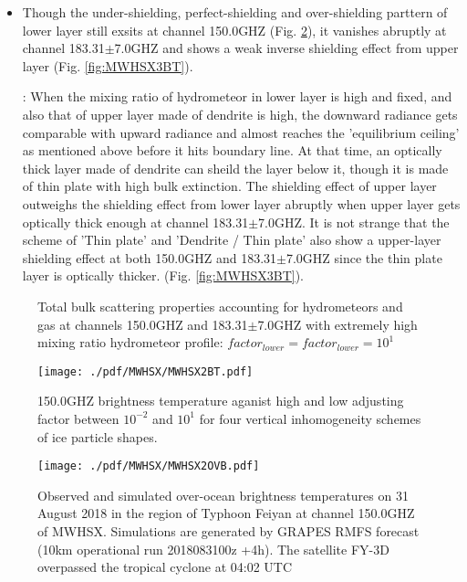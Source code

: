 \begin{itemize}
    \item {}
    Though the under-shielding, perfect-shielding and over-shielding parttern of lower layer still exsits at channel 150.0GHZ (Fig. \ref{fig:MWHSX2BT}), it vanishes abruptly 
at channel 183.31$\pm$7.0GHZ and shows a weak inverse shielding effect from upper layer (Fig. \ref{fig:MWHSX3BT}).

    : When the mixing ratio of hydrometeor in lower layer is high and fixed, and also that of upper layer made of dendrite is high, 
the downward radiance gets comparable with upward radiance and almost reaches the 'equilibrium ceiling' as mentioned above before it hits boundary line.
At that time, an optically thick layer made of dendrite can sheild the layer below it, though it is made of thin plate with high bulk extinction.
The shielding effect of upper layer outweighs the shielding effect from lower layer abruptly when upper layer gets optically thick enough at channel 183.31$\pm$7.0GHZ.
It is not strange that the scheme of 'Thin plate' and 'Dendrite / Thin plate' also show a upper-layer shielding effect 
at both 150.0GHZ and 183.31$\pm$7.0GHZ since the thin plate layer is optically thicker.
(Fig. \ref{fig:MWHSX3BT}).  
\end{itemize}


\begin{figure}[hbtp] 
\centering
{}
\caption{Total bulk scattering properties accounting for hydrometeors and gas at channels 150.0GHZ
and 183.31$\pm$7.0GHZ with extremely high mixing ratio hydrometeor profile: $factor_{lower} = factor_{lower} = 10^{1}$}
\label{fig:MWHSX23ABSP}
\end{figure}

\begin{figure}[hbtp] 
\centering
\texttt{[image: ./pdf/MWHSX/MWHSX2BT.pdf]}
\caption{150.0GHZ brightness temperature aganist high and low adjusting factor between $10^{-2}$ and $10^{1}$ for four vertical 
inhomogeneity schemes of ice particle shapes.}
\label{fig:MWHSX2BT}
\end{figure}

\begin{figure}[hbtp] 
\centering
\texttt{[image: ./pdf/MWHSX/MWHSX2OVB.pdf]}
\caption{Observed and simulated over-ocean brightness temperatures on 31 August 2018 in the region of Typhoon Feiyan at channel 150.0GHZ of MWHSX.
Simulations are generated by GRAPES RMFS forecast (10km operational run 2018083100z +4h). The satellite FY-3D overpassed the
tropical cyclone at 04:02 UTC}
\label{fig:MWHSX2OVB}
\end{figure}

